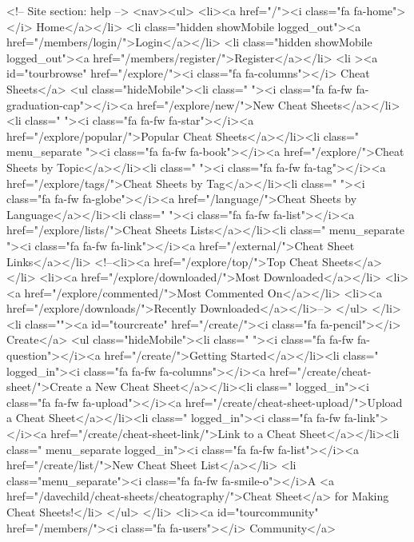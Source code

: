             <!-- Site section: help -->
            <nav><ul>
                <li><a href="/"><i class="fa fa-home"></i> Home</a></li>
                    <li class="hidden showMobile logged_out"><a href="/members/login/">Login</a></li>
                    <li class="hidden showMobile logged_out"><a href="/members/register/">Register</a></li>
                <li ><a id="tourbrowse" href="/explore/"><i class="fa fa-columns"></i> Cheat Sheets</a>
                <ul class="hideMobile"><li class=" "><i class="fa fa-fw fa-graduation-cap"></i><a href="/explore/new/">New Cheat Sheets</a></li><li class=" "><i class="fa fa-fw fa-star"></i><a href="/explore/popular/">Popular Cheat Sheets</a></li><li class=" menu_separate  "><i class="fa fa-fw fa-book"></i><a href="/explore/">Cheat Sheets by Topic</a></li><li class=" "><i class="fa fa-fw fa-tag"></i><a href="/explore/tags/">Cheat Sheets by Tag</a></li><li class=" "><i class="fa fa-fw fa-globe"></i><a href="/language/">Cheat Sheets by Language</a></li><li class=" "><i class="fa fa-fw fa-list"></i><a href="/explore/lists/">Cheat Sheets Lists</a></li><li class=" menu_separate  "><i class="fa fa-fw fa-link"></i><a href="/external/">Cheat Sheet Links</a></li>  <!--<li><a href="/explore/top/">Top Cheat Sheets</a></li>
                            <li><a href="/explore/downloaded/">Most Downloaded</a></li>
                            <li><a href="/explore/commented/">Most Commented On</a></li>
                            <li><a href="/explore/downloads/">Recently Downloaded</a></li>-->
                        </ul>
            		            	</li>
                <li class=""><a id="tourcreate" href="/create/"><i class="fa fa-pencil"></i> Create</a>
                <ul class="hideMobile"><li class=" "><i class="fa fa-fw fa-question"></i><a href="/create/">Getting Started</a></li><li class=" logged_in"><i class="fa fa-fw fa-columns"></i><a href="/create/cheat-sheet/">Create a New Cheat Sheet</a></li><li class=" logged_in"><i class="fa fa-fw fa-upload"></i><a href="/create/cheat-sheet-upload/">Upload a Cheat Sheet</a></li><li class=" logged_in"><i class="fa fa-fw fa-link"></i><a href="/create/cheat-sheet-link/">Link to a Cheat Sheet</a></li><li class=" menu_separate  logged_in"><i class="fa fa-fw fa-list"></i><a href="/create/list/">New Cheat Sheet List</a></li>
                        <li class="menu_separate"><i class="fa fa-fw fa-smile-o"></i>A <a href="/davechild/cheat-sheets/cheatography/">Cheat Sheet</a> for Making Cheat Sheets!</li>
                        </ul>
            		</li>
                <li><a id="tourcommunity" href="/members/"><i class="fa fa-users"></i> Community</a>
